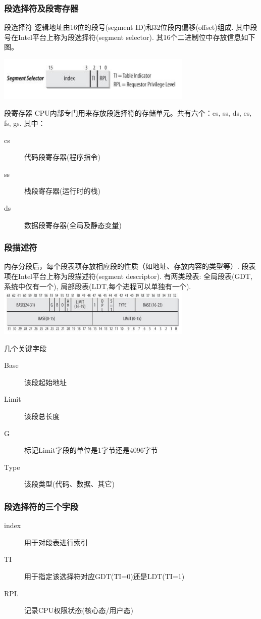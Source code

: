 \documentclass[xcolor=svgnames]{beamer}
\begin{document}
\begin{CJK*}{UTF8}{gbsn}
\begin{frame}[fragile]
\frametitle{段选择符及段寄存器}
\begin{block}{段选择符}
逻辑地址由16位的段号(segment ID)和32位段内偏移(offset)组成.
其中段号在Intel平台上称为段选择符(segment selector).
其16个二进制位中存放信息如下图。

\includegraphics[width=0.7\textwidth]{selector.png}
\end{block}
\begin{block}{段寄存器}
CPU内部专门用来存放段选择符的存储单元。共有六个：cs, ss, ds, es, fs, gs. 其中： 
\begin{description}
\item[cs] 代码段寄存器(程序指令)
\item[ss] 栈段寄存器(运行时的栈)
\item[ds] 数据段寄存器(全局及静态变量)
\end{description}
\end{block}
\end{frame}


\begin{frame}[fragile]
\frametitle{段描述符}
内存分段后，每个段表项存放相应段的性质（如地址、存放内容的类型等）.
段表项在Intel平台上称为段描述符(segment descriptor).
有两类段表: 全局段表(GDT,系统中仅有一个), 局部段表(LDT,每个进程可以单独有一个).
\includegraphics[width=0.7\textwidth]{descriptor.png}
\begin{block}{几个关键字段}
\begin{description}
\item[Base] 该段起始地址
\item[Limit] 该段总长度
\item[G] 标记Limit字段的单位是1字节还是4096字节
\item[Type] 该段类型(代码、数据、其它)
\end{description}
\end{block}
\end{frame}


\begin{frame}[fragile]
\frametitle{段选择符的三个字段}
\begin{description}
\item[index] 用于对段表进行索引
\item[TI] 用于指定该选择符对应GDT(TI=0)还是LDT(TI=1)
\item[RPL] 记录CPU权限状态(核心态/用户态)
\end{description}


\end{frame}
\end{CJK*}
\end{document}
